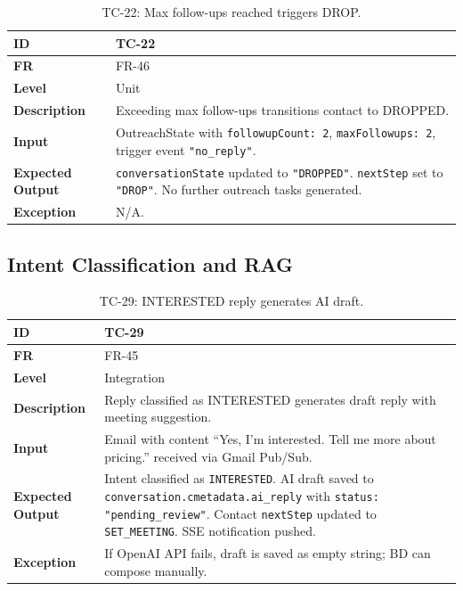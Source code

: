 \documentclass[a4paper]{article}
\begin{document}
\begin{table}[H]
\centering
\caption{TC-22: Max follow-ups reached triggers DROP.}
\begin{tabular}{|p{3cm}|p{10.5cm}|}
\hline
\textbf{ID} & TC-22 \\
\hline
\textbf{FR} & FR-46 \\
\hline
\textbf{Level} & Unit \\
\hline
\textbf{Description} & Exceeding max follow-ups transitions contact to DROPPED. \\
\hline
\textbf{Input} & OutreachState with \texttt{followupCount: 2}, \texttt{maxFollowups: 2}, trigger event \texttt{"no\_reply"}. \\
\hline
\textbf{Expected Output} & \texttt{conversationState} updated to \texttt{"DROPPED"}. \texttt{nextStep} set to \texttt{"DROP"}. No further outreach tasks generated. \\
\hline
\textbf{Exception} & N/A. \\
\hline
\end{tabular}
\small
\end{table}

\subsection{Intent Classification and RAG}

\begin{table}[H]
\centering
\caption{TC-29: INTERESTED reply generates AI draft.}
\small
\begin{tabular}{|p{3cm}|p{10.5cm}|}
\hline
\textbf{ID} & TC-29 \\
\hline
\textbf{FR} & FR-45 \\
\hline
\textbf{Level} & Integration \\
\hline
\textbf{Description} & Reply classified as INTERESTED generates draft reply with meeting suggestion. \\
\hline
\textbf{Input} & Email with content ``Yes, I'm interested. Tell me more about pricing.'' received via Gmail Pub/Sub. \\
\hline
\textbf{Expected Output} & Intent classified as \texttt{INTERESTED}. AI draft saved to \texttt{conversation.cmetadata.ai\_reply} with \texttt{status: "pending\_review"}. Contact \texttt{nextStep} updated to \texttt{SET\_MEETING}. SSE notification pushed. \\
\hline
\textbf{Exception} & If OpenAI API fails, draft is saved as empty string; BD can compose manually. \\
\hline
\end{tabular}
\end{table}
\end{document}
